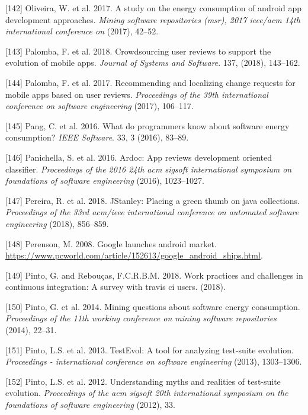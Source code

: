 \documentclass[]{book}
\begin{document}
\hypertarget{ref-OOC2017}{}
{[}142{]} Oliveira, W. et al. 2017. A study on the energy consumption of
android app development approaches. \emph{Mining software repositories
(msr), 2017 ieee/acm 14th international conference on} (2017), 42--52.

\hypertarget{ref-palomba2018crowdsourcing}{}
{[}143{]} Palomba, F. et al. 2018. Crowdsourcing user reviews to support
the evolution of mobile apps. \emph{Journal of Systems and Software}.
137, (2018), 143--162.

\hypertarget{ref-palomba2017recommending}{}
{[}144{]} Palomba, F. et al. 2017. Recommending and localizing change
requests for mobile apps based on user reviews. \emph{Proceedings of the
39th international conference on software engineering} (2017), 106--117.

\hypertarget{ref-PHA2016}{}
{[}145{]} Pang, C. et al. 2016. What do programmers know about software
energy consumption? \emph{IEEE Software}. 33, 3 (2016), 83--89.

\hypertarget{ref-panichella2016ardoc}{}
{[}146{]} Panichella, S. et al. 2016. Ardoc: App reviews development
oriented classifier. \emph{Proceedings of the 2016 24th acm sigsoft
international symposium on foundations of software engineering} (2016),
1023--1027.

\hypertarget{ref-PSCS2018}{}
{[}147{]} Pereira, R. et al. 2018. JStanley: Placing a green thumb on
java collections. \emph{Proceedings of the 33rd acm/ieee international
conference on automated software engineering} (2018), 856--859.

\hypertarget{ref-androidMarketLaunch}{}
{[}148{]} Perenson, M. 2008. Google launches android market.
\url{https://www.pcworld.com/article/152613/google_android_ships.html}.

\hypertarget{ref-pinto2018work}{}
{[}149{]} Pinto, G. and Rebouças, F.C.R.B.M. 2018. Work practices and
challenges in continuous integration: A survey with travis ci users.
(2018).

\hypertarget{ref-PCL2014}{}
{[}150{]} Pinto, G. et al. 2014. Mining questions about software energy
consumption. \emph{Proceedings of the 11th working conference on mining
software repositories} (2014), 22--31.

\hypertarget{ref-pinto2013}{}
{[}151{]} Pinto, L.S. et al. 2013. TestEvol: A tool for analyzing
test-suite evolution. \emph{Proceedings - international conference on
software engineering} (2013), 1303--1306.

\hypertarget{ref-pinto2012understanding}{}
{[}152{]} Pinto, L.S. et al. 2012. Understanding myths and realities of
test-suite evolution. \emph{Proceedings of the acm sigsoft 20th
international symposium on the foundations of software engineering}
(2012), 33.
\end{document}
